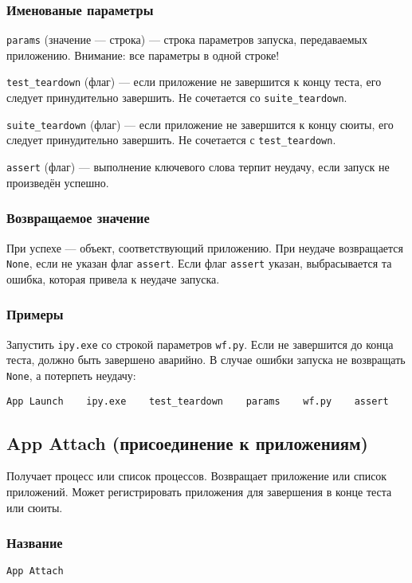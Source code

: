 \documentclass[11pt]{book} %
\begin{document}
\subsubsection*{Именованые параметры} 
\verb"params" (значение --- строка) --- строка параметров запуска, передаваемых приложению. Внимание: все параметры в одной строке!

\verb"test_teardown" (флаг) --- если приложение не завершится к концу теста, его следует принудительно завершить. Не сочетается со \verb"suite_teardown".

\verb"suite_teardown" (флаг) --- если приложение не завершится к концу сюиты, его следует принудительно завершить. Не сочетается с \verb"test_teardown".

\verb"assert" (флаг) --- выполнение ключевого слова терпит неудачу, если запуск не произведён успешно.

\subsubsection*{Возвращаемое значение} 
При успехе --- объект, соответствующий приложению. При неудаче возвращается \verb"None", если не указан флаг \verb"assert". Если флаг \verb"assert" указан, выбрасывается та ошибка, которая привела к неудаче запуска.

\subsubsection*{Примеры}
Запустить \verb"ipy.exe" со строкой параметров \verb"wf.py". Если не завершится до конца теста, должно быть завершено аварийно. В случае ошибки запуска не возвращать \verb"None", а потерпеть неудачу:

\begin{verbatim}App Launch    ipy.exe    test_teardown    params    wf.py    assert\end{verbatim}




\subsection{App Attach (присоединение к приложениям)}
Получает процесс или список процессов. Возвращает приложение или список приложений. Может регистрировать приложения для завершения в конце теста или сюиты.

\subsubsection*{Название} 
\verb"App Attach"
\end{document}

